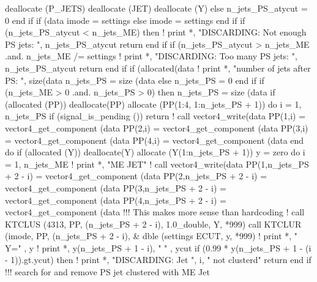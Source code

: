    deallocate (P_JETS)
   deallocate (JET)
   deallocate (Y)
else
   n_jets_PS_atycut = 0
end if
\nwendcode{}\nwdocspar
\nwenddocs{}\endmoddef
if (data%
   imode = settings%
else
   imode = settings%
end if
\nwendcode{}\nwdocspar
\nwenddocs{}\endmoddef
if (n_jets_PS_atycut < n_jets_ME) then
   ! print *, "DISCARDING: Not enough PS jets: ", n_jets_PS_atycut
   return
end if
if (n_jets_PS_atycut > n_jets_ME .and. n_jets_ME /= settings%
   ! print *, "DISCARDING: Too many PS jets: ", n_jets_PS_atycut
   return
end if
\nwendcode{}\nwdocspar
\nwenddocs{}\endmoddef
if (allocated(data%
   ! print *, "number of jets after PS: ", size(data%
   n_jets_PS = size (data%
else
   n_jets_PS = 0
end if
if (n_jets_ME > 0 .and. n_jets_PS > 0) then
   n_jets_PS = size (data%
   if (allocated (PP))  deallocate(PP)
   allocate (PP(1:4, 1:n_jets_PS + 1))
   do i = 1, n_jets_PS
      if (signal_is_pending ()) return
      ! call vector4_write(data%
      PP(1,i) = vector4_get_component (data%
      PP(2,i) = vector4_get_component (data%
      PP(3,i) = vector4_get_component (data%
      PP(4,i) = vector4_get_component (data%
   end do
   if (allocated (Y))  deallocate(Y)
   allocate (Y(1:n_jets_PS + 1))
   y = zero
   do i = 1, n_jets_ME
      ! print *, "ME JET"
      ! call vector4_write(data%
      PP(1,n_jets_PS + 2 - i) = vector4_get_component (data%
      PP(2,n_jets_PS + 2 - i) = vector4_get_component (data%
      PP(3,n_jets_PS + 2 - i) = vector4_get_component (data%
      PP(4,n_jets_PS + 2 - i) = vector4_get_component (data%
      !!! This makes more sense than hardcoding
      ! call KTCLUS (4313, PP, (n_jets_PS + 2 - i), 1.0_double, Y, *999)
      call KTCLUR (imode, PP, (n_jets_PS + 2 - i), &
        dble (settings%
        ECUT, y, *999)
      ! print *, "    Y=" , y
      ! print *, y(n_jets_PS + 1 - i), " " , ycut
      if (0.99 * y(n_jets_PS + 1 - (i - 1)).gt.ycut) then
         ! print *, "DISCARDING: Jet ", i, " not clusterd"
         return
      end if
      !!! search for and remove PS jet clustered with ME Jet
